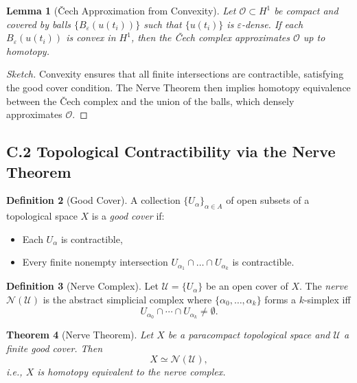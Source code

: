 \documentclass[11pt]{article}
\newtheorem{theorem}{Theorem}[section]
\newtheorem{lemma}[theorem]{Lemma}
\theoremstyle{definition}
\newtheorem{definition}[theorem]{Definition}
\begin{document}
\begin{lemma}[Čech Approximation from Convexity]
Let \( \mathcal{O} \subset H^1 \) be compact and covered by balls \( \{ B_\varepsilon(u(t_i)) \} \) such that \( \{ u(t_i) \} \) is \( \varepsilon \)-dense. If each \( B_\varepsilon(u(t_i)) \) is convex in \( H^1 \), then the Čech complex approximates \( \mathcal{O} \) up to homotopy.
\end{lemma}

\begin{proof}[Sketch]
Convexity ensures that all finite intersections are contractible, satisfying the good cover condition. The Nerve Theorem then implies homotopy equivalence between the Čech complex and the union of the balls, which densely approximates \( \mathcal{O} \).
\end{proof}

\subsection*{C.2 Topological Contractibility via the Nerve Theorem}

\begin{definition}[Good Cover]
A collection \( \{ U_\alpha \}_{\alpha \in A} \) of open subsets of a topological space \( X \) is a \emph{good cover} if:
\begin{itemize}
  \item Each \( U_\alpha \) is contractible,
  \item Every finite nonempty intersection \( U_{\alpha_1} \cap \dots \cap U_{\alpha_k} \) is contractible.
\end{itemize}
\end{definition}

\begin{definition}[Nerve Complex]
Let \( \mathcal{U} = \{ U_\alpha \} \) be an open cover of \( X \). The \emph{nerve} \( \mathcal{N}(\mathcal{U}) \) is the abstract simplicial complex where \( \{ \alpha_0, \dots, \alpha_k \} \) forms a \( k \)-simplex iff
\[
U_{\alpha_0} \cap \cdots \cap U_{\alpha_k} \neq \emptyset.
\]
\end{definition}

\begin{theorem}[Nerve Theorem]
Let \( X \) be a paracompact topological space and \( \mathcal{U} \) a finite good cover. Then
\[
X \simeq \mathcal{N}(\mathcal{U}),
\]
i.e., \( X \) is homotopy equivalent to the nerve complex.
\end{theorem}
\end{document}

